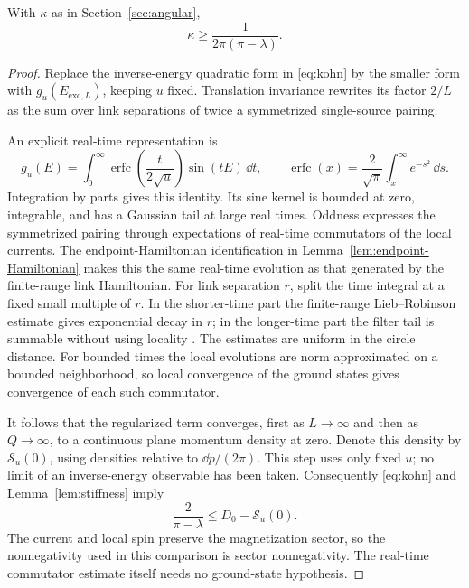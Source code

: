 \begin{lemma}\label{lem:infrared}
With \(\kappa\) as in Section~\ref{sec:angular},
\begin{equation}\label{eq:kappa-lower}
 \kappa\ge\frac1{2\pi(\pi-\lambda)}.
\end{equation}
\end{lemma}
\begin{proof}
Replace the inverse-energy quadratic form in \eqref{eq:kohn} by
the smaller form with \(g_u(E_{\mathrm{exc},L})\), keeping \(u\) fixed.
Translation invariance rewrites its factor \(2/L\) as the sum over
link separations of twice a symmetrized single-source pairing.

An explicit real-time representation is
\[
 g_u(E)=\int_0^\infty
       \operatorname{erfc}\!\left(\frac{t}{2\sqrt u}\right)
       \sin(tE)\,\dd t,\qquad
 \operatorname{erfc}(x)=\frac2{\sqrt\pi}\int_x^\infty e^{-s^2}\,\dd s.
\]
Integration by parts gives this identity. Its sine kernel is bounded at
zero, integrable, and has a Gaussian tail at large real times.
Oddness expresses the symmetrized pairing through expectations of
real-time commutators of the local currents.
The endpoint-Hamiltonian identification in
Lemma~\ref{lem:endpoint-Hamiltonian} makes this the same real-time evolution
as that generated by the finite-range link Hamiltonian.
For link separation \(r\), split the time integral at a fixed small
multiple of \(r\). In the shorter-time part the finite-range
Lieb--Robinson estimate gives exponential decay in \(r\); in the
longer-time part the filter tail is summable without using locality
\cite{LiebRobinson1972}. The estimates are uniform in the circle distance.
For bounded times the local evolutions are norm approximated on a bounded
neighborhood, so local convergence of the ground states gives convergence
of each such commutator.

It follows that the regularized term converges, first as \(L\to\infty\)
and then as \(Q\to\infty\), to a continuous plane momentum density at
zero. Denote this density by \(\mathcal S_u(0)\), using densities
relative to \(\dd p/(2\pi)\). This step uses only fixed \(u\);
no limit of an inverse-energy observable has been taken.
Consequently \eqref{eq:kohn} and Lemma~\ref{lem:stiffness} imply
\begin{equation}\label{eq:regularized-stiffness}
 \frac2{\pi-\lambda}\le D_0-\mathcal S_u(0).
\end{equation}
The current and local spin preserve the magnetization sector, so the
nonnegativity used in this comparison is sector nonnegativity. The
real-time commutator estimate itself needs no ground-state hypothesis.


\end{proof}
